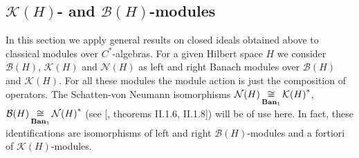 
\subsection{
    \texorpdfstring{$\mathcal{K}(H)$}{K(H)}- and
    \texorpdfstring{$\mathcal{B}(H)$}{B(H)}-modules}\label{
SubSectionKHAndBHModules}

In this section we apply general results on closed ideals obtained above to classical
modules over $C^*$-algebras.  For a given Hilbert space $H$ we consider
$\mathcal{B}(H)$, $\mathcal{K}(H)$ and $\mathcal{N}(H)$ as left and right Banach
modules over $\mathcal{B}(H)$ and $\mathcal{K}(H)$. For all these modules the module
action is just the composition of operators. The Schatten-von Neumann
isomorphisms $\mathcal{N}(H)\mathop{\mathbin{\cong}}\limits_{\mathbf{Ban}_1}{\mathcal{K}(H)}^*$,
$\mathcal{B}(H)\mathop{\mathbin{\cong}}\limits_{\mathbf{Ban}_1}{\mathcal{N}(H)}^*$ (see
[\cite{TakThOpAlgVol1}, theorems II.1.6, II.1.8]) will be of use here. 
In fact, these identifications are isomorphisms of left and right 
$\mathcal{B}(H)$-modules and a fortiori of $\mathcal{K}(H)$-modules.

